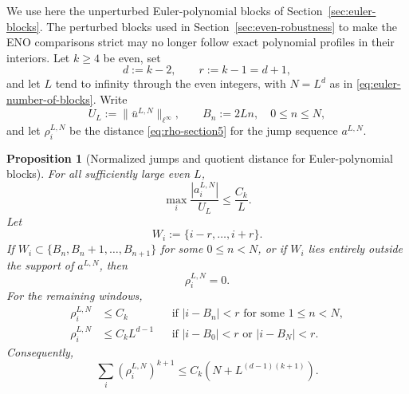 \documentclass[11pt]{amsart}
\theoremstyle{plain}
\newtheorem{proposition}[theorem]{Proposition}
\theoremstyle{definition}
\theoremstyle{remark}
\numberwithin{equation}{section}
\theoremstyle{plain}
\begin{document}
We use here the unperturbed Euler-polynomial blocks of
Section~\ref{sec:euler-blocks}.
The perturbed blocks used in Section~\ref{sec:even-robustness} to make the
ENO comparisons strict may no longer follow exact polynomial profiles in their
interiors.
Let $k\ge4$ be even, set
\begin{equation}\label{eq:euler-replacement-parameters}
	d:=k-2,
	\qquad
	r:=k-1=d+1,
\end{equation}
and let $L$ tend to infinity through the even integers, with
$N=L^d$ as in \eqref{eq:euler-number-of-blocks}.  Write
\begin{equation}\label{eq:euler-boundary-and-amplitude-notation}
	U_L:=\|\bar u^{L,N}\|_{\ell^\infty},
	\qquad
	B_n:=2Ln,
	\quad 0\le n\le N,
\end{equation}
and let $\rho_i^{L,N}$ be the distance
\eqref{eq:rho-section5} for the jump sequence $a^{L,N}$.

\begin{proposition}[Normalized jumps and quotient distance for Euler-polynomial blocks]
	\label{prop:euler-replacement-quantities}
	For all sufficiently large even $L$,
	\begin{equation}\label{eq:euler-normalized-jumps}
		\max_i\frac{|a_i^{L,N}|}{U_L}
		\le\frac{C_k}{L}.
	\end{equation}
	Let
	\[
	W_i:=\{i-r,\ldots,i+r\}.
	\]
	If $W_i\subset\{B_n,B_n+1,\ldots,B_{n+1}\}$ for some
	$0\le n<N$, or if $W_i$ lies entirely outside the support of $a^{L,N}$,
	then
	\begin{equation}\label{eq:euler-rho-interior}
		\rho_i^{L,N}=0.
	\end{equation}
	For the remaining windows,
	\begin{align}
		\rho_i^{L,N}
		&\le C_k
		&&\text{if }|i-B_n|<r
		\text{ for some }1\le n<N,
		\label{eq:euler-rho-junction}\\
		\rho_i^{L,N}
		&\le C_kL^{d-1}
		&&\text{if }|i-B_0|<r
		\text{ or }|i-B_N|<r.
		\label{eq:euler-rho-outer}
	\end{align}
	Consequently,
	\begin{equation}\label{eq:euler-rho-global}
		\sum_i(\rho_i^{L,N})^{k+1}
		\le C_k\left(N+L^{(d-1)(k+1)}\right).
	\end{equation}
\end{proposition}
\end{document}
